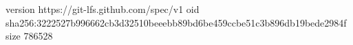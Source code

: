 version https://git-lfs.github.com/spec/v1
oid sha256:3222527b996662cb3d32510beeebb89bd6be459ccbe51c3b896db19bede2984f
size 786528
